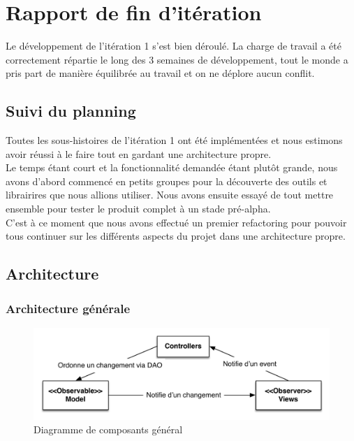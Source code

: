 \section{Rapport de fin d'itération}

Le développement de l'itération 1 s'est bien déroulé. La charge de travail a 
été correctement répartie le long des 3 semaines de développement, tout le monde
a pris part de manière équilibrée au travail et on ne déplore aucun conflit.\\

\subsection{Suivi du planning}

Toutes les sous-histoires de l'itération 1 ont été implémentées et nous estimons
avoir réussi à le faire tout en gardant une architecture propre.\\

Le temps étant court et la fonctionnalité demandée étant plutôt grande, nous 
avons d'abord commencé en petits groupes pour la découverte des outils et
librairires que nous allions utiliser. Nous avons ensuite essayé de tout mettre
ensemble pour tester le produit complet à un stade pré-alpha.\\

C'est à ce moment que nous avons effectué un premier refactoring pour pouvoir
tous continuer sur les différents aspects du projet dans une architecture propre.

\subsection{Architecture}

	\subsubsection{Architecture générale}
	\begin{figure}[h]
		\includegraphics[width=\textwidth]{uml/general-architecture.pdf}
		\caption{\label{fig:mvc:components} Diagramme de composants général}
	\end{figure}


